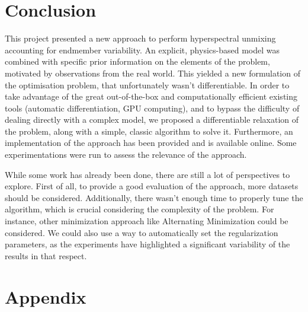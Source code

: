 \documentclass{article}
\begin{document}
\section{Conclusion}

This project presented a new approach to perform hyperspectral unmixing accounting for endmember variability. An explicit, physics-based model was combined with specific prior information on the elements of the problem, motivated by observations from the real world. This yielded a new formulation of the optimisation problem, that unfortunately wasn't differentiable. In order to take advantage of the great out-of-the-box and computationally efficient existing tools (automatic differentiation, GPU computing), and to bypass the difficulty of dealing directly with a complex model, we proposed a differentiable relaxation of the problem, along with a simple, classic algorithm to solve it. Furthermore, an implementation of the approach has been provided and is available online. Some experimentations were run to assess the relevance of the approach.

While some work has already been done, there are still a lot of perspectives to explore. First of all, to provide a good evaluation of the approach, more datasets should be considered. Additionally, there wasn't enough time to properly tune the algorithm, which is crucial considering the complexity of the problem. For instance, other minimization approach like Alternating Minimization could be considered. We could also use a way to automatically set the regularization parameters, as the experiments have highlighted a significant variability of the results in that respect.




% 



\section{Appendix}
\end{document}
